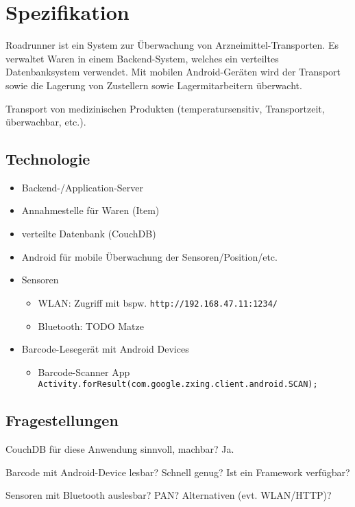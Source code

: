 \section{Spezifikation}
\label{sec:specification}

Roadrunner ist ein System zur Überwachung von Arzneimittel-Transporten. Es verwaltet Waren in einem Backend-System, welches ein verteiltes Datenbanksystem verwendet. Mit mobilen Android-Geräten wird der Transport sowie die Lagerung von Zustellern sowie Lagermitarbeitern überwacht.

Transport von medizinischen Produkten (temperatursensitiv, Transportzeit, überwachbar, etc.).

\subsection{Technologie}

\begin{itemize}
	\item Backend-/Application-Server
	\item Annahmestelle für Waren (Item)
	\item verteilte Datenbank (CouchDB)
	\item Android für mobile Überwachung der Sensoren/Position/etc.
	\item Sensoren
		\begin{itemize}
			\item WLAN: Zugriff mit bspw. \verb=http://192.168.47.11:1234/=
			\item Bluetooth: TODO Matze
		\end{itemize}
	\item Barcode-Lesegerät mit Android Devices
		\begin{itemize}
			\item Barcode-Scanner App\\
			\verb=Activity.forResult(com.google.zxing.client.android.SCAN);=
		\end{itemize}
\end{itemize}

\subsection{Fragestellungen}

CouchDB für diese Anwendung sinnvoll, machbar? Ja.

Barcode mit Android-Device lesbar? Schnell genug? Ist ein Framework verfügbar?

Sensoren mit Bluetooth auslesbar? PAN? Alternativen (evt. WLAN/HTTP)?

